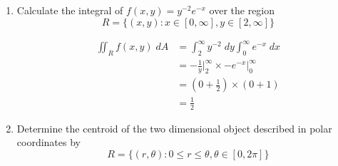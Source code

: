 \documentclass[a4paper,11pt]{article}
\begin{document}
\begin{preview}
\begin{enumerate}
\begin{enumerate}
    \item Calculate the integral of $f(x,y) = y^{-2}e^{-x}$ over the region
    $$ R = \{ (x,y): x \in [0,\infty], y \in [2,\infty]\} $$

    \begin{align*}
        \iint_R f(x,y) \; dA &= \int_{2}^{\infty} y^{-2} \;dy \int_{0}^{\infty} e^{-x} \;dx\\
        &= -\frac{1}{y}\Big|_{2}^{\infty}  \times -e^{-x}\Big|_{0}^{\infty} \\
        &= \left( 0 + \frac{1}{2} \right) \times \left( 0 + 1 \right)\\
        &= \frac{1}{2}
    \end{align*}

    \item Determine the centroid of the two dimensional object described in polar coordinates by
    $$ R = \{ (r, \theta): 0 \leq r \leq \theta, \theta \in [0, 2\pi] \} $$


\end{enumerate}
\end{enumerate}
\end{preview}
\end{document}
